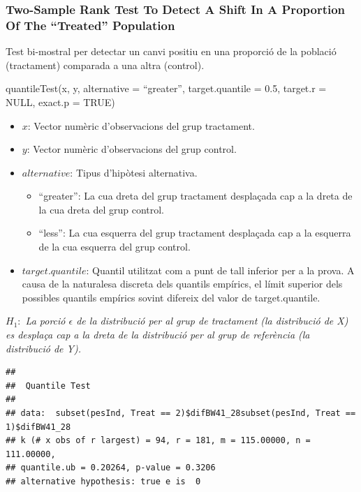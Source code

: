 \documentclass[
  11pt,
]{article}
\begin{document}
\hypertarget{two-sample-rank-test-to-detect-a-shift-in-a-proportion-of-the-treated-population}{%
\subsubsection{Two-Sample Rank Test To Detect A Shift In A Proportion Of
The ``Treated''
Population}\label{two-sample-rank-test-to-detect-a-shift-in-a-proportion-of-the-treated-population}}

Test bi-mostral per detectar un canvi positiu en una proporció de la
població (tractament) comparada a una altra (control).

quantileTest(x, y, alternative = ``greater'', target.quantile = 0.5,
target.r = NULL, exact.p = TRUE)

\begin{itemize}
\item
  \(x\): Vector numèric d'observacions del grup tractament.
\item
  \(y\): Vector numèric d'observacions del grup control.
\item
  \(alternative\): Tipus d'hipòtesi alternativa.

  \begin{itemize}
  \item
    ``greater'': La cua dreta del grup tractament desplaçada cap a la
    dreta de la cua dreta del grup control.
  \item
    ``less'': La cua esquerra del grup tractament desplaçada cap a la
    esquerra de la cua esquerra del grup control.
  \end{itemize}
\item
  \(target.quantile\): Quantil utilitzat com a punt de tall inferior per
  a la prova. A causa de la naturalesa discreta dels quantils empírics,
  el límit superior dels possibles quantils empírics sovint difereix del
  valor de target.quantile.
\end{itemize}

\emph{\(H_1:\) La porció \(\epsilon\) de la distribució per al grup de
tractament (la distribució de X) es desplaça cap a la dreta de la
distribució per al grup de referència (la distribució de Y).}

\begin{verbatim}
## 
##  Quantile Test
## 
## data:  subset(pesInd, Treat == 2)$difBW41_28subset(pesInd, Treat == 1)$difBW41_28
## k (# x obs of r largest) = 94, r = 181, m = 115.00000, n = 111.00000,
## quantile.ub = 0.20264, p-value = 0.3206
## alternative hypothesis: true e is  0
\end{verbatim}
\end{document}
